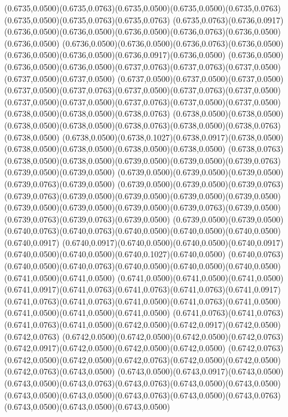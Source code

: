 (0.6735,0.0500)(0.6735,0.0763)(0.6735,0.0500)(0.6735,0.0500)(0.6735,0.0763)(0.6735,0.0500)(0.6735,0.0763)(0.6735,0.0763)
(0.6735,0.0763)(0.6736,0.0917)(0.6736,0.0500)(0.6736,0.0500)(0.6736,0.0500)(0.6736,0.0763)(0.6736,0.0500)(0.6736,0.0500)
(0.6736,0.0500)(0.6736,0.0500)(0.6736,0.0763)(0.6736,0.0500)(0.6736,0.0500)(0.6736,0.0500)(0.6736,0.0917)(0.6736,0.0500)
(0.6736,0.0500)(0.6736,0.0500)(0.6736,0.0500)(0.6737,0.0763)(0.6737,0.0763)(0.6737,0.0500)(0.6737,0.0500)(0.6737,0.0500)
(0.6737,0.0500)(0.6737,0.0500)(0.6737,0.0500)(0.6737,0.0500)(0.6737,0.0763)(0.6737,0.0500)(0.6737,0.0763)(0.6737,0.0500)
(0.6737,0.0500)(0.6737,0.0500)(0.6737,0.0763)(0.6737,0.0500)(0.6737,0.0500)(0.6738,0.0500)(0.6738,0.0500)(0.6738,0.0763)
(0.6738,0.0500)(0.6738,0.0500)(0.6738,0.0500)(0.6738,0.0500)(0.6738,0.0763)(0.6738,0.0500)(0.6738,0.0763)(0.6738,0.0500)
(0.6738,0.0500)(0.6738,0.1027)(0.6738,0.0917)(0.6738,0.0500)(0.6738,0.0500)(0.6738,0.0500)(0.6738,0.0500)(0.6738,0.0500)
(0.6738,0.0763)(0.6738,0.0500)(0.6738,0.0500)(0.6739,0.0500)(0.6739,0.0500)(0.6739,0.0763)(0.6739,0.0500)(0.6739,0.0500)
(0.6739,0.0500)(0.6739,0.0500)(0.6739,0.0500)(0.6739,0.0763)(0.6739,0.0500)
\PST@Solid(0.6739,0.0500)(0.6739,0.0500)(0.6739,0.0763)(0.6739,0.0763)(0.6739,0.0500)(0.6739,0.0500)(0.6739,0.0500)(0.6739,0.0500)
(0.6739,0.0500)(0.6739,0.0500)(0.6739,0.0500)(0.6739,0.0763)(0.6739,0.0500)(0.6739,0.0763)(0.6739,0.0763)(0.6739,0.0500)
(0.6739,0.0500)(0.6739,0.0500)(0.6740,0.0763)(0.6740,0.0763)(0.6740,0.0500)(0.6740,0.0500)(0.6740,0.0500)(0.6740,0.0917)
(0.6740,0.0917)(0.6740,0.0500)(0.6740,0.0500)(0.6740,0.0917)(0.6740,0.0500)(0.6740,0.0500)(0.6740,0.1027)(0.6740,0.0500)
(0.6740,0.0763)(0.6740,0.0500)(0.6740,0.0763)(0.6740,0.0500)(0.6740,0.0500)(0.6740,0.0500)(0.6741,0.0500)(0.6741,0.0500)
(0.6741,0.0500)(0.6741,0.0500)(0.6741,0.0500)(0.6741,0.0917)(0.6741,0.0763)(0.6741,0.0763)(0.6741,0.0763)(0.6741,0.0917)
(0.6741,0.0763)(0.6741,0.0763)(0.6741,0.0500)(0.6741,0.0763)(0.6741,0.0500)(0.6741,0.0500)(0.6741,0.0500)(0.6741,0.0500)
(0.6741,0.0763)(0.6741,0.0763)(0.6741,0.0763)(0.6741,0.0500)(0.6742,0.0500)(0.6742,0.0917)(0.6742,0.0500)(0.6742,0.0763)
(0.6742,0.0500)(0.6742,0.0500)(0.6742,0.0500)(0.6742,0.0763)(0.6742,0.0917)(0.6742,0.0500)(0.6742,0.0500)(0.6742,0.0500)
(0.6742,0.0763)(0.6742,0.0500)(0.6742,0.0500)(0.6742,0.0763)(0.6742,0.0500)(0.6742,0.0500)(0.6742,0.0763)(0.6743,0.0500)
(0.6743,0.0500)(0.6743,0.0917)(0.6743,0.0500)(0.6743,0.0500)(0.6743,0.0763)(0.6743,0.0763)(0.6743,0.0500)(0.6743,0.0500)
(0.6743,0.0500)(0.6743,0.0500)(0.6743,0.0763)(0.6743,0.0500)(0.6743,0.0763)(0.6743,0.0500)(0.6743,0.0500)(0.6743,0.0500)
